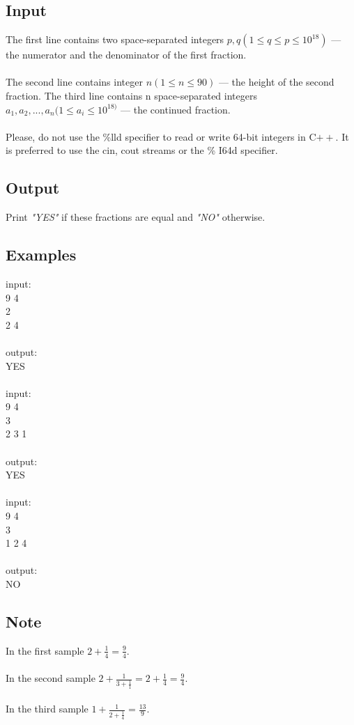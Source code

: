 \documentclass[10pt,a4paper]{article}
\begin{document}
\begin{itemize}
\subsection*{Input}
The first line contains two space-separated integers $p, q (1 \leq q \leq p \leq 10^{18})$ — the numerator and the denominator of the first fraction.
\\ \\
The second line contains integer $n (1 \leq n \leq 90)$ — the height of the second fraction. The third line contains n space-separated integers $a_1,a_2,...,a_n (1\leq a_i\leq 10^{18)}$ — the continued fraction.
\\ \\
Please, do not use the \%lld specifier to read or write 64-bit integers in C$++$. It is preferred to use the cin, cout streams or the \% I64d specifier.
\subsection*{Output}
Print \textit{"YES"} if these fractions are equal and \textit{"NO"} otherwise.
\subsection*{Examples}
input: \\
9 4 \\
2 \\
2 4 \\ 
\\ 
output: \\
YES \\
\\
input: \\
9 4 \\
3 \\
2 3  1 \\
\\
output: \\
YES \\
\\
input: \\
9 4 \\
3 \\
1 2 4 \\
\\
output: \\
NO 

\subsection*{Note}
In the first sample $2 + \frac{1}{4} = \frac{9}{4}$.
\\ \\
In the second sample $2 + \frac{1}{3 + \frac{1}{1}} = 2 + \frac{1}{4} = \frac{9}{4}$.
\\ \\
In the third sample $1 + \frac{1}{2 + \frac{1}{4}} = \frac{13}{9}$.

\end{itemize}
\end{document}
